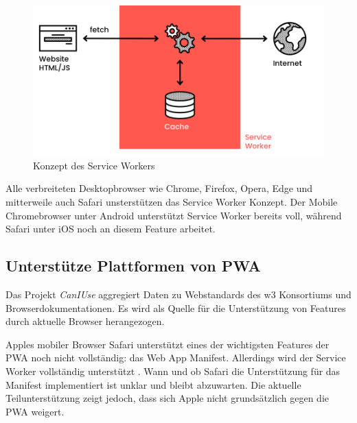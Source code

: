 \begin{figure}[h]
        \includegraphics[width=\linewidth]{img/ServiceWorker-8a0968f1b295f1ff.png}
        \centering
        \caption{Konzept des Service Workers \cite{ServiceWorkerDiagramm}}
        \label{fig:serviceWorker}
\end{figure}


Alle verbreiteten Desktopbrowser wie Chrome, Firefox, Opera, Edge und mitterweile auch Safari unsterstützen das Service Worker Konzept. Der Mobile Chromebrowser unter Android unterstützt Service Worker bereits voll, während Safari unter iOS noch an diesem Feature arbeitet. \cite[S. 9]{BeginningPWA}


\subsection{Unterstütze Plattformen von PWA}
Das Projekt \textit{CanIUse} aggregiert Daten zu Webstandards des w3 Konsortiums und Browserdokumentationen. Es wird als Quelle für die Unterstützung von Features durch aktuelle Browser herangezogen.

Apples mobiler Browser Safari unterstützt eines der wichtigsten Features der PWA noch nicht vollständig: das Web App Manifest. Allerdings wird der Service Worker vollständig unterstützt \cite{CanIUseWebManifest}. Wann und ob Safari die Unterstützung für das Manifest implementiert ist unklar und bleibt abzuwarten. Die aktuelle Teilunterstützung zeigt jedoch, dass sich Apple nicht grundsätzlich gegen die PWA weigert.





